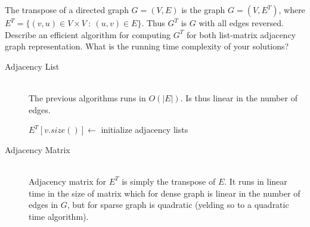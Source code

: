 \begin{problem}
The transpose of a directed graph $G = (V,E)$  is the graph $G = (V,E^T)$, where
$ E^T = \{ (v,u) \in V \times V \: : \: (u,v) \in E \}$. Thus $G^T$ is $G$ with all edges reversed.
Describe an efficient algorithm for computing $G^T$ for both  list-matrix adjacency  graph representation. What is the running time complexity of your solutions?

\begin{solution}
\begin{description}
\item [Adjacency List] \hfill \\
The previous algorithms runs in $O(|E|)$. Is thus linear in the number of edges.
	\begin{algorithm}
 $E^T[v.size()] \gets $ initialize adjacency lists\;
 
 
\;
\end{algorithm}



\item [Adjacency Matrix] \hfill \\	
Adjacency matrix for $E^T$ is simply the transpose of $E$. It runs in linear time in the size of matrix which for dense graph is linear in the number of edges in $G$, but for sparse graph is quadratic (yelding so to a quadratic time algorithm).
\end{description}

\end{solution}
\end{problem}

